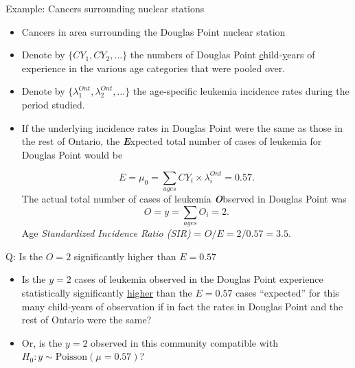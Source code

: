 \documentclass[10pt,handout]{beamer}\usepackage[]{graphicx}\usepackage[]{color}
\begin{document}
\begin{frame}{Example: Cancers surrounding nuclear stations}
	\small
	
	\begin{itemize}
		\setlength\itemsep{.3em}
		\item Cancers in area surrounding the Douglas Point nuclear station \pause
		\item Denote by $\{CY_{1},CY_{2}, \dots \}$ the numbers of Douglas Point \underline{c}hild-\underline{y}ears of experience in the various age categories that were pooled over.  
		\item Denote by $\{\lambda^{Ont}_{1}, \lambda^{Ont}_{2},  \dots \}$ the age-specific leukemia incidence rates during the period studied. \pause
		\item If the underlying incidence rates in Douglas Point were the same as those in the rest of Ontario, the \textbf{\textit{E}}xpected total number of cases of leukemia for Douglas Point would be
		
		$$E = \mu_{0} = \sum_{ages} CY_{i} \times \lambda^{Ont}_{i}  = 0.57.$$
		\pause
		The actual total number of cases of leukemia \textbf{\textit{O}}bserved in Douglas Point was 
		$$O = y = \sum_{ages} O_{i}  = 2.$$
		\pause
		Age \textit{Standardized Incidence Ratio (SIR)} = $O/E = 2/0.57 = 3.5.$
	\end{itemize}
	
\end{frame}





\begin{frame}{Q: Is the $O=2$ significantly higher than $E=0.57$}
	
	
	\begin{itemize}
		\setlength\itemsep{1.2em}
		\item Is the $y = 2$ cases of leukemia observed in the Douglas Point experience statistically significantly \underline{higher} than the $E=0.57$  cases ``expected'' for this many child-years of  observation  if in fact the rates in Douglas Point and the rest of Ontario were the same? 
		\item Or, is the $y=2$ observed in this community compatible with $H_{0}: y \sim \textrm{Poisson}(\mu = 0.57)$?
	\end{itemize}
	
\end{frame}
\end{document}
